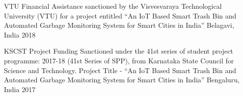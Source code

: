 \begin{cvhonors}

  \cvhonor
    {VTU} %
    {Financial Assistance sanctioned by the Visvesvaraya Technological University (VTU) for a project entitled “An IoT Based Smart Trash Bin and Automated Garbage Monitoring System for Smart Cities in India”} %
    {Belagavi, India} %
    {2018} %


  \cvhonor
    {KSCST} %
    {Project Funding Sanctioned under the 41st series of student project programme: 2017-18 (41st Series of SPP), from Karnataka State Council for Science and Technology. Project Title - “An IoT Based Smart Trash Bin and Automated Garbage Monitoring System for Smart Cities in India”} %
    {Bengaluru, India} %
    {2017} %


\end{cvhonors}